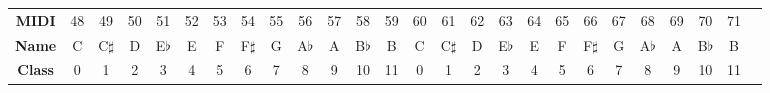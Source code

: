 \begin{tabular}{c|cccccccccccc|cccccccccccc|c}
\textbf{MIDI}  & 48 & 49 & 50 & 51 & 52 & 53 & 54 & 55 & 56 & 57 & 58 & 59 & 60 & 61 & 62 & 63 & 64 & 65 & 66 & 67 & 68 & 69 & 70 & 71 & 
\\
\textbf{Name}  & C & C$\sharp$ & D & E$\flat$ & E & F & F$\sharp$ & G & A$\flat$ & A & B$\flat$ & B & C & C$\sharp$ & D & E$\flat$ & E & F & F$\sharp$ & G & A$\flat$ & A & B$\flat$ & B & 
\\
\textbf{Class}  & 0 & 1 & 2 & 3 & 4 & 5 & 6 & 7 & 8 & 9 & 10 & 11 & 0 & 1 & 2 & 3 & 4 & 5 & 6 & 7 & 8 & 9 & 10 & 11 & 
\end{tabular}
